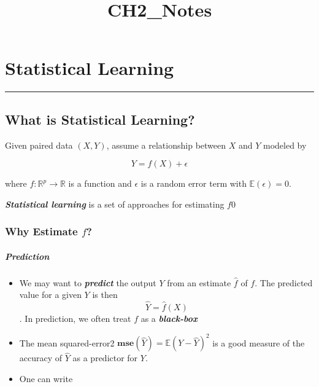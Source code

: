 \documentclass[11pt]{article}
\title{CH2\_Notes}
\begin{document}
    
    
    \maketitle
    
    

    
    \hypertarget{statistical-learning}{%
\section{Statistical Learning}\label{statistical-learning}}

\begin{center}\rule{0.5\linewidth}{\linethickness}\end{center}

    \hypertarget{what-is-statistical-learning}{%
\subsection{What is Statistical
Learning?}\label{what-is-statistical-learning}}

    Given paired data \((X, Y)\), assume a relationship between \(X\) and
\(Y\) modeled by

\[ Y = f(X) + \epsilon \]

where \(f:\mathbb{R}^p \rightarrow \mathbb{R}\) is a function and
\(\epsilon\) is a random error term with \(\mathbb{E}(\epsilon) = 0\).

\textbf{\emph{Statistical learning}} is a set of approaches for
estimating \(f\)0

    \hypertarget{why-estimate-f}{%
\subsubsection{\texorpdfstring{Why Estimate
\(f\)?}{Why Estimate f?}}\label{why-estimate-f}}

    \hypertarget{prediction}{%
\subparagraph{Prediction}\label{prediction}}

    \begin{itemize}
\item
  We may want to \textbf{\emph{predict}} the output \(Y\) from an
  estimate \(\hat{f}\) of \(f\). The predicted value for a given \(Y\)
  is then \[ \hat{Y} = \hat{f}(X)\]. In prediction, we often treat \(f\)
  as a \textbf{\emph{black-box}}
\item
  The mean squared-error2
  \(\mathbf{mse}(\hat{Y})=\mathbb{E}(Y-\hat{Y})^2\) is a good measure of
  the accuracy of \(\hat{Y}\) as a predictor for \(Y\).
\item
  One can write
\end{itemize}
\end{document}
